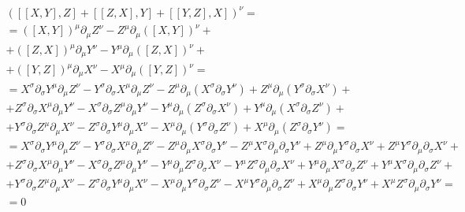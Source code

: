 \documentclass{article}
\begin{document}
\begin{equation}
\begin{gathered}
    \left(\left[\left[X, Y\right], Z\right] +
    \left[\left[Z, X\right], Y\right] +
    \left[\left[Y, Z\right], X\right]\right)^\nu = \\ =
    \left(\left[X, Y\right]\right)^\mu\partial_\mu Z^\nu - Z^\mu\partial_\mu \left(\left[X, Y\right]\right)^\nu + \\ +
    \left(\left[Z, X\right]\right)^\mu\partial_\mu Y^\nu - Y^\mu\partial_\mu \left(\left[Z, X\right]\right)^\nu + \\ +
    \left(\left[Y, Z\right]\right)^\mu\partial_\mu X^\nu - X^\mu\partial_\mu \left(\left[Y, Z\right]\right)^\nu = \\ =
    X^\sigma\partial_\sigma Y^\mu\partial_\mu Z^\nu - Y^\sigma\partial_\sigma X^\mu\partial_\mu Z^\nu - Z^\mu\partial_\mu \left(X^\sigma\partial_\sigma Y^\nu\right) + Z^\mu\partial_\mu \left(Y^\sigma\partial_\sigma X^\nu\right) + \\ +
    Z^\sigma\partial_\sigma X^\mu\partial_\mu Y^\nu - X^\sigma\partial_\sigma Z^\mu\partial_\mu Y^\nu - Y^\mu\partial_\mu \left(Z^\sigma\partial_\sigma X^\nu\right) + Y^\mu\partial_\mu \left(X^\sigma\partial_\sigma Z^\nu\right) + \\ +
    Y^\sigma\partial_\sigma Z^\mu\partial_\mu X^\nu - Z^\sigma\partial_\sigma Y^\mu\partial_\mu X^\nu - X^\mu\partial_\mu \left(Y^\sigma\partial_\sigma Z^\nu\right) + X^\mu\partial_\mu \left(Z^\sigma\partial_\sigma Y^\nu\right) = \\ =
    X^\sigma\partial_\sigma Y^\mu\partial_\mu Z^\nu - Y^\sigma\partial_\sigma X^\mu\partial_\mu Z^\nu - Z^\mu\partial_\mu X^\sigma\partial_\sigma Y^\nu - Z^\mu X^\sigma\partial_\mu\partial_\sigma Y^\nu + Z^\mu\partial_\mu Y^\sigma\partial_\sigma X^\nu + Z^\mu Y^\sigma \partial_\mu \partial_\sigma X^\nu + \\ +
    Z^\sigma\partial_\sigma X^\mu\partial_\mu Y^\nu - X^\sigma\partial_\sigma Z^\mu\partial_\mu Y^\nu - Y^\mu\partial_\mu Z^\sigma\partial_\sigma X^\nu - Y^\mu Z^\sigma\partial_\mu\partial_\sigma X^\nu + Y^\mu\partial_\mu X^\sigma\partial_\sigma Z^\nu + Y^\mu X^\sigma \partial_\mu \partial_\sigma Z^\nu + \\ +
    Y^\sigma\partial_\sigma Z^\mu\partial_\mu X^\nu - Z^\sigma\partial_\sigma Y^\mu\partial_\mu X^\nu - X^\mu\partial_\mu Y^\sigma\partial_\sigma Z^\nu - X^\mu Y^\sigma\partial_\mu\partial_\sigma Z^\nu + X^\mu\partial_\mu Z^\sigma\partial_\sigma Y^\nu + X^\mu Z^\sigma \partial_\mu \partial_\sigma Y^\nu = \\
    = 0
\end{gathered}
\end{equation}
\end{document}
